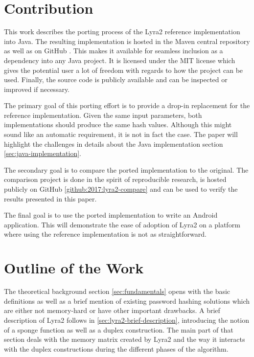 \section{Contribution}
This work describes the porting process of the Lyra2 reference implementation into Java. The resulting implementation is hosted in the Maven central repository \cite{maven:2017:lyra2} as well as on GitHub \cite{github:2017:lyra2-java}. This makes it available for seamless inclusion as a dependency into any Java project. It is licensed under the MIT license which gives the potential user a lot of freedom with regards to how the project can be used. Finally, the source code is publicly available and can be inspected or improved if necessary.

The primary goal of this porting effort is to provide a drop-in replacement for the reference implementation. Given the same input parameters, both implementations should produce the same hash values. Although this might sound like an automatic requirement, it is not in fact the case. The paper will highlight the challenges in details about the Java implementation section \ref{sec:java-implementation}.

The secondary goal is to compare the ported implementation to the original. The comparison project is done in the spirit of reproducible research, is hosted publicly on GitHub \ref{github:2017:lyra2-compare} and can be used to verify the results presented in this paper.

The final goal is to use the ported implementation to write an Android application. This will demonstrate the ease of adoption of Lyra2 on a platform where using the reference implementation is not as straightforward.

\section{Outline of the Work}

The theoretical background section \ref{sec:fundamentals} opens with the basic definitions as well as a brief mention of existing password hashing solutions which are either not memory-hard or have other important drawbacks. A brief description of Lyra2 follows in \ref{sec:lyra2-brief-description}, introducing the notion of a sponge function as well as a duplex construction. The main part of that section deals with the memory matrix created by Lyra2 and the way it interacts with the duplex constructions during the different phases of the algorithm.

